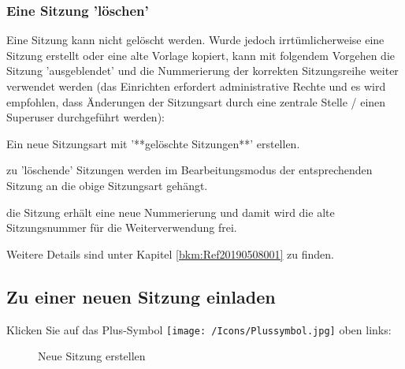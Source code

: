 \subsubsection{Eine Sitzung 'löschen'}
Eine Sitzung kann nicht gelöscht werden. Wurde jedoch irrtümlicherweise eine Sitzung erstellt oder eine alte Vorlage kopiert, kann mit folgendem Vorgehen die Sitzung 'ausgeblendet' und die Nummerierung der korrekten Sitzungsreihe weiter verwendet werden (das Einrichten erfordert administrative Rechte und es wird empfohlen, dass Änderungen der Sitzungsart durch eine zentrale Stelle / einen Superuser durchgeführt werden):

\begin{compactitem}
	\item Ein neue Sitzungsart mit '**gelöschte Sitzungen**' erstellen.
	\item zu 'löschende' Sitzungen werden im Bearbeitungsmodus der entsprechenden Sitzung an die obige Sitzungsart gehängt.
	\item die Sitzung erhält eine neue Nummerierung und damit wird die alte Sitzungsnummer für die Weiterverwendung frei.
	\item Weitere Details sind unter Kapitel \ref{bkm:Ref20190508001} zu finden.
\end{compactitem}

\vspace{\baselineskip}

\subsection{Zu einer neuen Sitzung einladen}
\label{bkm:Ref434828480}

Klicken Sie auf das Plus-Symbol \texttt{[image: /Icons/Plussymbol.jpg]}  oben links:

\vspace{\baselineskip}

\begin{figure}[H]
\caption{Neue Sitzung erstellen}
\end{figure}

